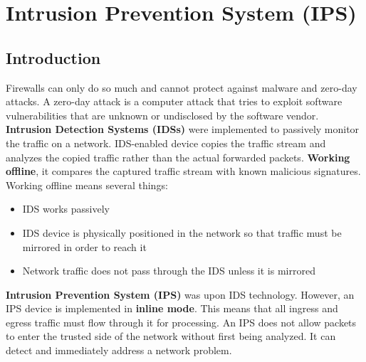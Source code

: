 \chapter{Intrusion Prevention System (IPS)}

\section{Introduction}

Firewalls can only do so much and cannot protect against malware and zero-day attacks. A zero-day attack is a computer attack that tries to exploit software vulnerabilities that are unknown or undisclosed by the software vendor. \\

\textbf{Intrusion Detection Systems (IDSs)} were implemented to passively monitor the traffic on a network. IDS-enabled device copies the traffic stream and analyzes the copied traffic rather than the actual forwarded packets. \textbf{Working offline}, it compares the captured traffic stream with known malicious signatures. Working offline means several things:

\begin{itemize}
\item IDS works passively
\item IDS device is physically positioned in the network so that traffic must be mirrored in order to reach it
\item Network traffic does not pass through the IDS unless it is mirrored
\end{itemize}


\textbf{Intrusion Prevention System (IPS)} was upon IDS technology. However, an IPS device is implemented in \textbf{inline mode}. This means that all ingress and egress traffic must flow through it for processing. An IPS does not allow packets to enter the trusted side of the network without first being analyzed. It can detect and immediately address a network problem. \\
%

